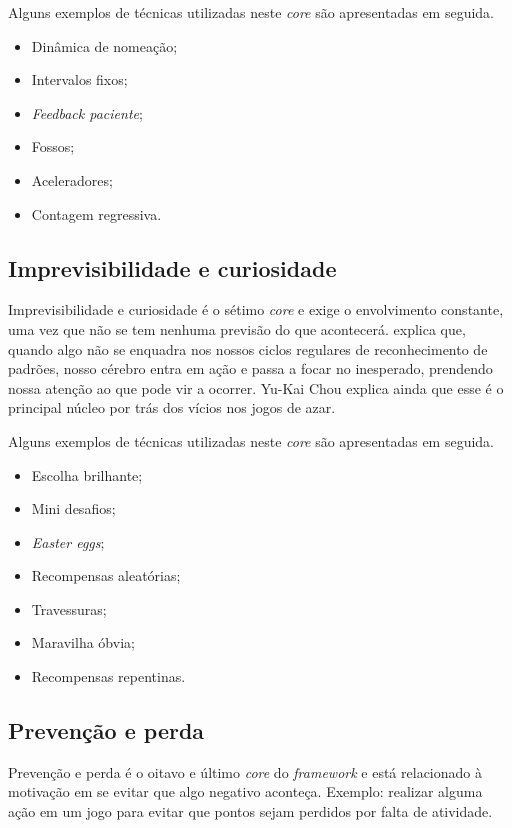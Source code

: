Alguns exemplos de técnicas utilizadas neste \textit{core} são apresentadas em seguida.

\begin{itemize}
	\item Dinâmica de nomeação;
	\item Intervalos fixos;
	\item \textit{Feedback paciente};
	\item Fossos;
	\item Aceleradores;
	\item Contagem regressiva.
\end{itemize}


\subsection{Imprevisibilidade e curiosidade}
Imprevisibilidade e curiosidade é o sétimo \textit{core} e exige o envolvimento constante, uma vez que não se tem nenhuma previsão
do que acontecerá.  explica que, quando algo não se enquadra nos nossos ciclos regulares de reconhecimento
de padrões, nosso cérebro entra em ação e passa a focar no inesperado, prendendo nossa atenção ao que pode vir a ocorrer. Yu-Kai Chou explica
ainda que esse é o principal núcleo por trás dos vícios nos jogos de azar.

Alguns exemplos de técnicas utilizadas neste \textit{core} são apresentadas em seguida.

\begin{itemize}
	\item Escolha brilhante;
	\item Mini desafios;
	\item \textit{Easter eggs};
	\item Recompensas aleatórias;
	\item Travessuras;
	\item Maravilha óbvia;
	\item Recompensas repentinas.
\end{itemize}



\subsection{Prevenção e perda}
Prevenção e perda é o oitavo e último \textit{core} do \textit{framework} e está relacionado à motivação em se evitar que algo negativo
aconteça. Exemplo: realizar alguma ação em um jogo para evitar que pontos sejam perdidos por falta de atividade.


